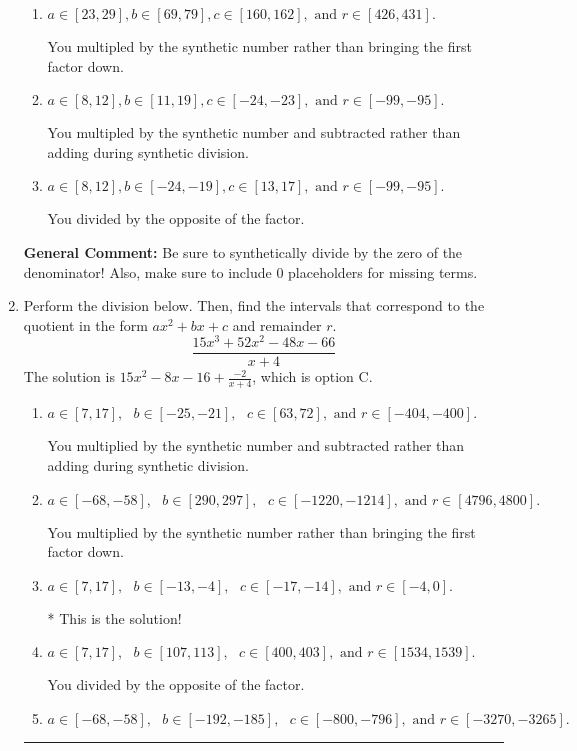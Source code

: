 \documentclass{extbook}[14pt]
\newcommand{\litem}[1]{\item #1

\rule{\textwidth}{0.4pt}}
\begin{document}
\begin{enumerate}
{\begin{enumerate}[label=\Alph*.]
 You divided by the opposite of the factor AND multipled the first factor rather than just bringing it down.
\item \( a \in [23, 29], b \in [69, 79], c \in [160, 162], \text{ and } r \in [426, 431]. \)

 You multipled by the synthetic number rather than bringing the first factor down.
\item \( a \in [8, 12], b \in [11, 19], c \in [-24, -23], \text{ and } r \in [-99, -95]. \)

 You multipled by the synthetic number and subtracted rather than adding during synthetic division.
\item \( a \in [8, 12], b \in [-24, -19], c \in [13, 17], \text{ and } r \in [-99, -95]. \)

 You divided by the opposite of the factor.
\end{enumerate}

\textbf{General Comment:} Be sure to synthetically divide by the zero of the denominator! Also, make sure to include 0 placeholders for missing terms.
}
\litem{
Perform the division below. Then, find the intervals that correspond to the quotient in the form $ax^2+bx+c$ and remainder $r$.
\[ \frac{15x^{3} +52 x^{2} -48 x -66}{x + 4} \]The solution is \( 15x^{2} -8 x -16 + \frac{-2}{x + 4} \), which is option C.\begin{enumerate}[label=\Alph*.]
\item \( a \in [7, 17], \text{   } b \in [-25, -21], \text{   } c \in [63, 72], \text{   and   } r \in [-404, -400]. \)

 You multiplied by the synthetic number and subtracted rather than adding during synthetic division.
\item \( a \in [-68, -58], \text{   } b \in [290, 297], \text{   } c \in [-1220, -1214], \text{   and   } r \in [4796, 4800]. \)

 You multiplied by the synthetic number rather than bringing the first factor down.
\item \( a \in [7, 17], \text{   } b \in [-13, -4], \text{   } c \in [-17, -14], \text{   and   } r \in [-4, 0]. \)

* This is the solution!
\item \( a \in [7, 17], \text{   } b \in [107, 113], \text{   } c \in [400, 403], \text{   and   } r \in [1534, 1539]. \)

 You divided by the opposite of the factor.
\item \( a \in [-68, -58], \text{   } b \in [-192, -185], \text{   } c \in [-800, -796], \text{   and   } r \in [-3270, -3265]. \)


\end{enumerate}}
\end{enumerate}
\end{document}
